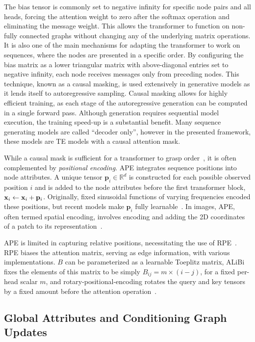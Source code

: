 The bias tensor is commonly set to negative infinity for specific node pairs and all heads, forcing the attention weight to zero after the softmax operation and eliminating the message weight. This allows the transformer to function on non-fully connected graphs without changing any of the underlying matrix operations.
It is also one of the main mechanisms for adapting the transformer to work on sequences, where the nodes are presented in a specific order.
By configuring the bias matrix as a lower triangular matrix with above-diagonal entries set to negative infinity, each node receives messages only from preceding nodes.
This technique, known as a causal masking, is used extensively in generative models as it lends itself to autoregressive sampling.
Causal masking allows for highly efficient training, as each stage of the autoregressive generation can be computed in a single forward pass.
Although generation requires sequential model execution, the training speed-up is a substantial benefit.
Many sequence generating models are called ``decoder only'', however in the presented framework, these models are \Gls{TE} models with a causal attention mask.

While a causal mask is sufficient for a transformer to grasp order~\cite{TransformerLanguageModels}, it is often complemented by \textit{positional encoding}.
\Gls{APE} integrates sequence positions into node attributes.
A unique tensor $\mathbf{p}_i \in \mathbb{R}^{d}$ is constructed for each possible observed position $i$ and is added to the node attributes before the first transformer block, $\mathbf{x}_i \leftarrow \mathbf{x}_i + \mathbf{p}_i$.
Originally, fixed sinusoidal functions of varying frequencies encoded these positions, but recent models make $\mathbf{p}_i$ fully learnable~\cite{GPT}.
In images, \Gls{APE}, often termed spatial encoding, involves encoding and adding the 2D coordinates of a patch to its representation~\cite{VisionTransformer}.

\Gls{APE} is limited in capturing relative positions, necessitating the use of \Gls{RPE}~\cite{SelfAttentionRelativePosition}.
\Gls{RPE} biases the attention matrix, serving as edge information, with various implementations.
$B$ can be parameterized as a learnable Toeplitz matrix, ALiBi~\cite{ALIBI} fixes the elements of this matrix to be simply $B_{ij} = m\times(i - j)$, for a fixed per-head scalar $m$, and rotary-positional-encoding rotates the query and key tensors by a fixed amount before the attention operation~\cite{RoFormerEnhancedTransformer}.

\subsection{Global Attributes and Conditioning Graph Updates}
\label{sec:global_attributes}

